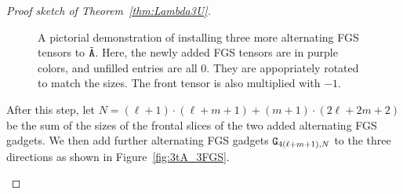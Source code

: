 \begin{proof}[Proof sketch of Theorem~\ref{thm:Lambda3U}]
\begin{figure}[!htbp]
{}




\caption{\label{fig:3tA_2FGS}A pictorial demonstration of installing three more alternating FGS tensors to  $\tilde{\mathtt{A}}$. Here, the newly added FGS tensors are in purple colors, and unfilled entries are all $0$. They are appopriately rotated to match the sizes. The front tensor is also multiplied with $-1$.}
\end{figure}

After this step, let $N=
(\ell+1)\cdot(\ell+m+1)+(m+1)\cdot(2\ell+2m+2)$ be the sum of the sizes of the frontal slices of the two added alternating FGS gadgets. We then add further alternating FGS gadgets $\mathtt{G}_{4(\ell+m+1), N}$ to the three directions as shown in Figure~\ref{fig:3tA_3FGS}.

\begin{figure}[!htbp]
	
	\centering
	
	
	
	
	
	\begin{tikzpicture}[x=0.75pt,y=0.75pt,yscale=-1,xscale=1]
		

\end{tikzpicture}
\end{figure}
\end{proof}
